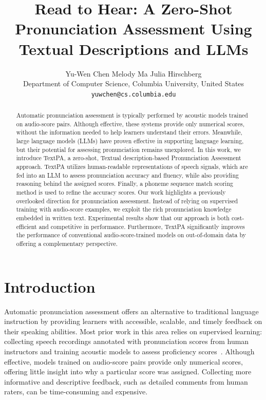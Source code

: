 \documentclass[11pt]{article}
\title{Read to Hear: A Zero-Shot Pronunciation Assessment Using Textual Descriptions and LLMs}
\author{Yu-Wen Chen \quad Melody Ma \quad Julia Hirschberg \\
Department of Computer Science, Columbia University, United States \\
\texttt{yuwchen@cs.columbia.edu}}
\begin{document}
\maketitle
\begin{abstract}
Automatic pronunciation assessment is typically performed by acoustic models trained on audio-score pairs. Although effective, these systems provide only numerical scores, without the information needed to help learners understand their errors. Meanwhile, large language models (LLMs) have proven effective in supporting language learning, but their potential for assessing pronunciation remains unexplored. In this work, we introduce TextPA, a zero-shot, Textual description-based Pronunciation Assessment approach. TextPA utilizes human-readable representations of speech signals, which are fed into an LLM to assess pronunciation accuracy and fluency, while also providing reasoning behind the assigned scores. Finally, a phoneme sequence match scoring method is used to refine the accuracy scores. Our work highlights a previously overlooked direction for pronunciation assessment. Instead of relying on supervised training with audio-score examples, we exploit the rich pronunciation knowledge embedded in written text. Experimental results show that our approach is both cost-efficient and competitive in performance. Furthermore, TextPA significantly improves the performance of conventional audio-score-trained models on out-of-domain data by offering a complementary perspective.


\end{abstract}

\section{Introduction}

Automatic pronunciation assessment offers an alternative to traditional language instruction by providing learners with accessible, scalable, and timely feedback on their speaking abilities. Most prior work in this area relies on supervised learning: collecting speech recordings annotated with pronunciation scores from human instructors and training acoustic models to assess proficiency scores~\cite{chen2023multipa, gong2022transformer}. Although effective, models trained on audio-score pairs provide only numerical scores, offering little insight into why a particular score was assigned. Collecting more informative and descriptive feedback, such as detailed comments from human raters, can be time-consuming and expensive.
\end{document}

